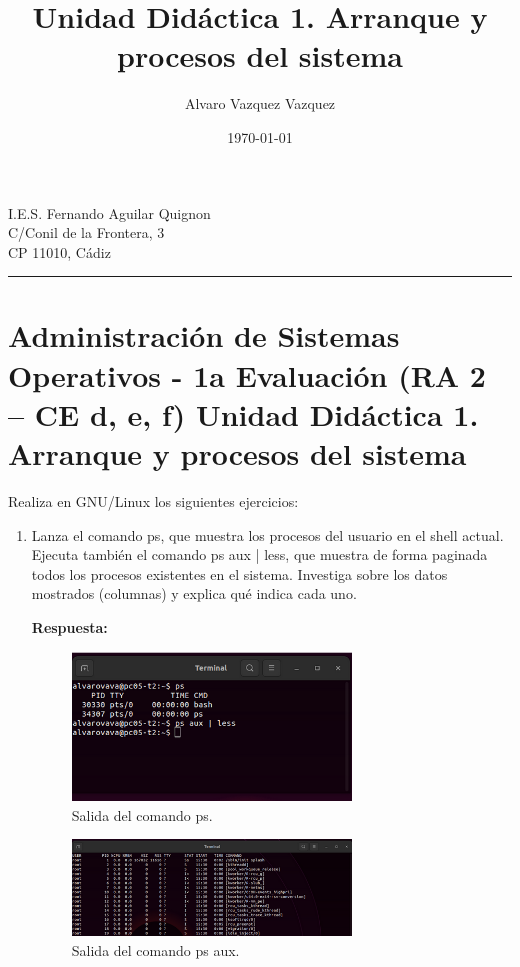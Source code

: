 \documentclass[a4paper,12pt]{article}
\title{Unidad Didáctica 1. Arranque y procesos del sistema}
\author{Alvaro Vazquez Vazquez}
\date{\today}
\begin{document}
\maketitle

\noindent
I.E.S. Fernando Aguilar Quignon \\
C/Conil de la Frontera, 3 \\
CP 11010, Cádiz \\
\hrule

\section*{Administración de Sistemas Operativos - 1a Evaluación (RA 2 – CE d, e, f)
Unidad Didáctica 1. Arranque y procesos del sistema}
Realiza en GNU/Linux los siguientes ejercicios:

\begin{enumerate}[label=\textbf{Pregunta \arabic*.}]
    \item Lanza el comando ps, que muestra los procesos del usuario en el shell actual.
    Ejecuta también el comando ps aux | less, que muestra de forma paginada todos los
    procesos existentes en el sistema. Investiga sobre los datos mostrados (columnas)
    y explica qué indica cada uno.

    \textbf{Respuesta:}

    \begin{figure}[h!]
        \centering
        \includegraphics[width=0.7\textwidth]{1.png}
        \caption{Salida del comando ps.}
    \end{figure}
    \newpage
    \begin{figure}[h!]
        \centering
        \includegraphics[width=0.7\textwidth]{2.png}
        \caption{Salida del comando ps aux.}
    \end{figure}




\end{enumerate}
\end{document}
